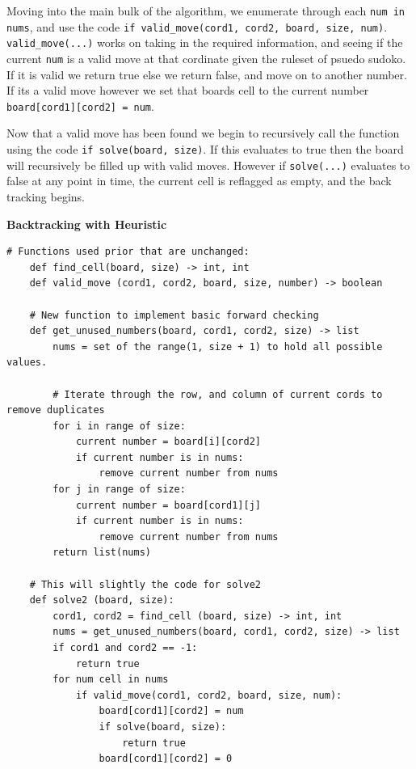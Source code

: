 \documentclass{article}
\begin{document}
	Moving into the main bulk of the algorithm, we enumerate through each \verb|num in nums|, and use the code
	\verb|if valid_move(cord1, cord2, board, size, num)|. \verb|valid_move(...)| works on taking in the required information,
	and seeing if the current \verb|num| is a valid move at that cordinate given the ruleset of psuedo sudoko. If it is valid we return true
	else we return false, and move on to another number. If its a valid move however we set that boards cell to the current number
	\verb|board[cord1][cord2] = num|.

	Now that a valid move has been found we begin to recursively call the function using the code \verb|if solve(board, size)|. If this evaluates to true
	then the board will recursively be filled up with valid moves. However if \verb|solve(...)| evaluates to false at any point in time, the current cell is reflagged 
	as empty, and the back tracking begins. \\



\pagebreak

\noindent \textbf{Backtracking with Heuristic}

\begin{lstlisting}[frame=single]
	# Functions used prior that are unchanged:
	def find_cell(board, size) -> int, int
	def valid_move (cord1, cord2, board, size, number) -> boolean

	# New function to implement basic forward checking
	def get_unused_numbers(board, cord1, cord2, size) -> list
		nums = set of the range(1, size + 1) to hold all possible values.

		# Iterate through the row, and column of current cords to remove duplicates
		for i in range of size:
			current number = board[i][cord2]
			if current number is in nums:
				remove current number from nums
		for j in range of size:
			current number = board[cord1][j]
			if current number is in nums:
				remove current number from nums
		return list(nums)

	# This will slightly the code for solve2
	def solve2 (board, size):
		cord1, cord2 = find_cell (board, size) -> int, int
		nums = get_unused_numbers(board, cord1, cord2, size) -> list
		if cord1 and cord2 == -1:
			return true
		for num cell in nums
			if valid_move(cord1, cord2, board, size, num):
				board[cord1][cord2] = num
				if solve(board, size):
					return true
				board[cord1][cord2] = 0

\end{lstlisting}
\end{document}
